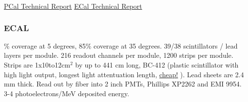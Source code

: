 \href{https://www.sciencedirect.com/science/article/pii/S0168900220300309?via\%3Dihub}{PCal Technical Report}
\href{https://www.sciencedirect.com/science/article/pii/S0168900200009967}{ECal Technical Report}

                
        \subsubsection{ECAL}
                \% coverage at 5 degrees, 85\% coverage at 35 degrees. 39/38 scintillators / lead layers per module. 216 readout channels per module, 1200 strips per module. Strips are 1x10to12cm$^2$ by up to 441 cm long, BC-412 (plastic scintillator with high light output, longest light attentuation length, \href{https://www.crystals.saint-gobain.com/products/bc-408-bc-412-bc-416}{cheap!} ). Lead sheets are 2.4 mm thick. Read out by fiber into 2 inch PMTs, Phillips XP2262 and EMI 9954. 3-4 photoelectrons/MeV deposited energy. 
